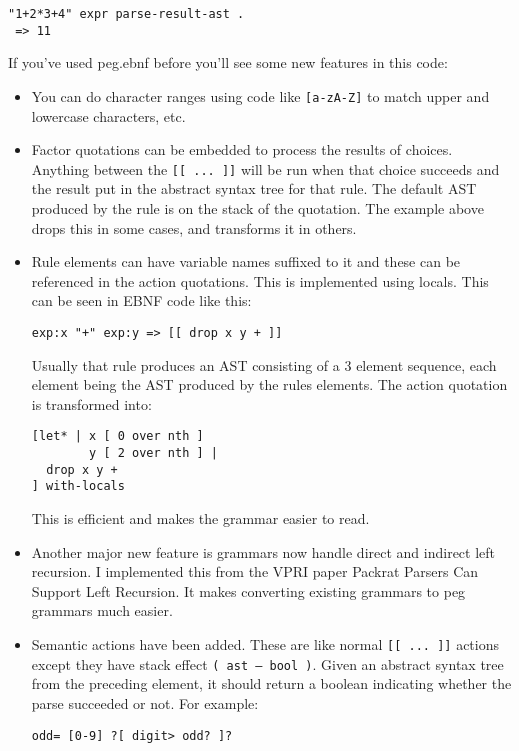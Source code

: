 \begin{verbatim}
"1+2*3+4" expr parse-result-ast .
 => 11
\end{verbatim}

If you've used peg.ebnf before you'll see some new features in this code:

\begin{itemize}
\item You can do character ranges using code like \texttt{[a-zA-Z]} to
  match upper and lowercase characters, etc.

\item Factor quotations can be embedded to process the results of
  choices. Anything between the \texttt{[[ ... ]]} will be run when that choice
  succeeds and the result put in the abstract syntax tree for that
  rule. The default AST produced by the rule is on the stack of the
  quotation. The example above drops this in some cases, and
  transforms it in others.

\item Rule elements can have variable names suffixed to it and these
  can be referenced in the action quotations. This is implemented
  using locals. This can be seen in EBNF code like this:
\begin{verbatim}
exp:x "+" exp:y => [[ drop x y + ]]
\end{verbatim}

      Usually that rule produces an AST consisting of a 3 element
      sequence, each element being the AST produced by the rules
      elements. The action quotation is transformed into:

\begin{verbatim}
[let* | x [ 0 over nth ] 
        y [ 2 over nth ] |
  drop x y + 
] with-locals
\end{verbatim}

      This is efficient and makes the grammar easier to read.

\item Another major new feature is grammars now handle direct and
  indirect left recursion. I implemented this from the VPRI paper
  Packrat Parsers Can Support Left Recursion. It makes converting
  existing grammars to peg grammars much easier.

\item Semantic actions have been added. These are like normal
  \texttt{[[ ... ]]} actions except they have stack effect \texttt{(
    ast -- bool )}. Given an abstract syntax tree from the preceding
  element, it should return a boolean indicating whether the parse
  succeeded or not. For example:
\begin{verbatim}
odd= [0-9] ?[ digit> odd? ]?
\end{verbatim}


\end{itemize}
